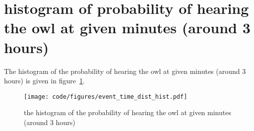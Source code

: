 \section{histogram of probability of hearing the owl at given minutes (around 3 hours)}
The histogram of the probability of hearing the owl at given minutes (around 3 hours) is given in figure~\ref{fig:histogram}.
\begin{figure}[h]
\centering
\texttt{[image: code/figures/event\_time\_dist\_hist.pdf]}
\caption{the histogram of the probability of hearing the owl at given minutes (around 3 hours)} \label{fig:histogram}
\end{figure}
\FloatBarrier








